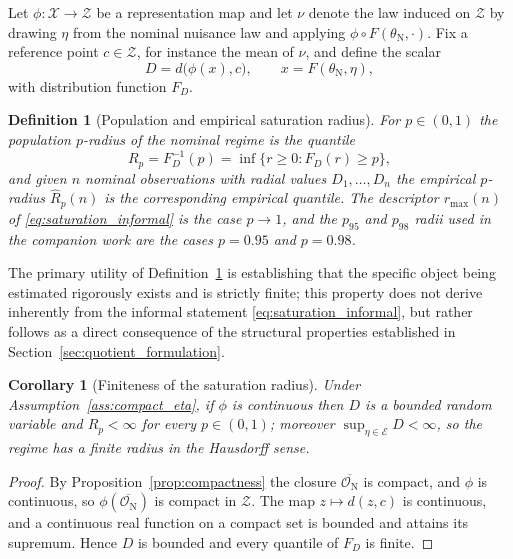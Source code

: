 \documentclass[a4paper]{cas-sc}
\newtheorem{definition}{Definition}
\newtheorem{corollary}{Corollary}
\newcommand{\X}{\ensuremath{\mathcal{X}}}
\newcommand{\Z}{\ensuremath{\mathcal{Z}}}
\newcommand{\EtaSpace}{\ensuremath{\mathcal{E}}}
\begin{document}
Let \(\phi:\X\to\Z\) be a representation map and let \(\nu\) denote the law
induced on \(\Z\) by drawing \(\eta\) from the nominal nuisance law and
applying \(\phi\circ F(\theta_{\mathrm N},\cdot)\). Fix a reference point
\(c\in\Z\), for instance the mean of \(\nu\), and define the scalar
\begin{equation}
D = d\bigl(\phi(x),c\bigr), \qquad x = F(\theta_{\mathrm N},\eta),
\label{eq:radial_variable}
\end{equation}
with distribution function \(F_D\).

\begin{definition}[Population and empirical saturation radius]
\label{def:saturation_radius}
For \(p\in(0,1)\) the \emph{population \(p\)-radius} of the nominal regime is
the quantile
\begin{equation}
R_p = F_D^{-1}(p) = \inf\{r\ge 0 : F_D(r)\ge p\},
\label{eq:population_radius}
\end{equation}
and given \(n\) nominal observations with radial values
\(D_1,\ldots,D_n\) the \emph{empirical \(p\)-radius} \(\widehat R_p(n)\) is the
corresponding empirical quantile. The descriptor \(r_{\max}(n)\) of
\eqref{eq:saturation_informal} is the case \(p\to 1\), and the \(p_{95}\) and
\(p_{98}\) radii used in the companion work are the cases \(p=0.95\) and
\(p=0.98\).
\end{definition}

The primary utility of Definition~\ref{def:saturation_radius} is establishing that the specific object being estimated rigorously exists and is strictly finite; this property does not derive inherently from the informal statement \eqref{eq:saturation_informal}, but rather follows as a direct consequence of the structural properties established in Section~\ref{sec:quotient_formulation}.

\begin{corollary}[Finiteness of the saturation radius]
\label{cor:finite_radius}
Under Assumption~\ref{ass:compact_eta}, if \(\phi\) is continuous then \(D\) is
a bounded random variable and \(R_p<\infty\) for every \(p\in(0,1)\); moreover
\(\sup_{\eta\in\EtaSpace} D<\infty\), so the regime has a finite radius in the
Hausdorff sense.
\end{corollary}

\begin{proof}
By Proposition~\ref{prop:compactness} the closure
\(\overline{\mathcal{O}_{\mathrm N}}\) is compact, and \(\phi\) is continuous,
so \(\phi(\overline{\mathcal{O}_{\mathrm N}})\) is compact in \(\Z\). The map
\(z\mapsto d(z,c)\) is continuous, and a continuous real function on a compact
set is bounded and attains its supremum. Hence \(D\) is bounded and every
quantile of \(F_D\) is finite.
\end{proof}
\end{document}

